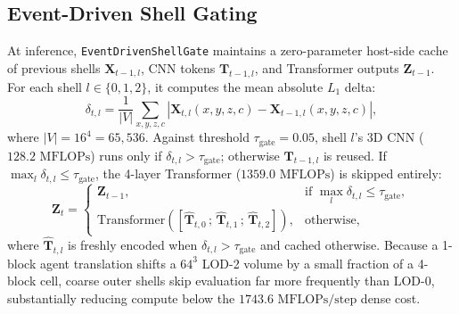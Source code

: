 \documentclass[runningheads]{llncs}
\begin{document}
\subsection{Event-Driven Shell Gating}
At inference, \texttt{EventDrivenShellGate} maintains a zero-parameter host-side cache of previous shells $\mathbf{X}_{t-1,l}$, CNN tokens $\mathbf{T}_{t-1,l}$, and Transformer outputs $\mathbf{Z}_{t-1}$. For each shell $l \in \{0, 1, 2\}$, it computes the mean absolute $L_1$ delta:
\begin{equation}
\delta_{t,l} = \frac{1}{|V|} \sum_{x,y,z,c} \left| \mathbf{X}_{t,l}(x,y,z,c) - \mathbf{X}_{t-1,l}(x,y,z,c) \right|,
\end{equation}
where $|V| = 16^4 = 65{,}536$. Against threshold $\tau_{\text{gate}} = 0.05$, shell $l$'s 3D CNN ($128.2\text{ MFLOPs}$) runs only if $\delta_{t,l} > \tau_{\text{gate}}$; otherwise $\mathbf{T}_{t-1,l}$ is reused. If $\max_l \delta_{t,l} \le \tau_{\text{gate}}$, the 4-layer Transformer ($1359.0\text{ MFLOPs}$) is skipped entirely:
\begin{equation}
\mathbf{Z}_t = \begin{cases}
\mathbf{Z}_{t-1}, & \text{if } \max_l \delta_{t,l} \le \tau_{\text{gate}}, \\
\mathrm{Transformer}\left(\left[\hat{\mathbf{T}}_{t,0}\,;\,\hat{\mathbf{T}}_{t,1}\,;\,\hat{\mathbf{T}}_{t,2}\right]\right), & \text{otherwise},
\end{cases}
\end{equation}
where $\hat{\mathbf{T}}_{t,l}$ is freshly encoded when $\delta_{t,l} > \tau_{\text{gate}}$ and cached otherwise. Because a 1-block agent translation shifts a $64^3$ LOD-2 volume by a small fraction of a 4-block cell, coarse outer shells skip evaluation far more frequently than LOD-0, substantially reducing compute below the $1743.6\text{ MFLOPs/step}$ dense cost.
\end{document}
